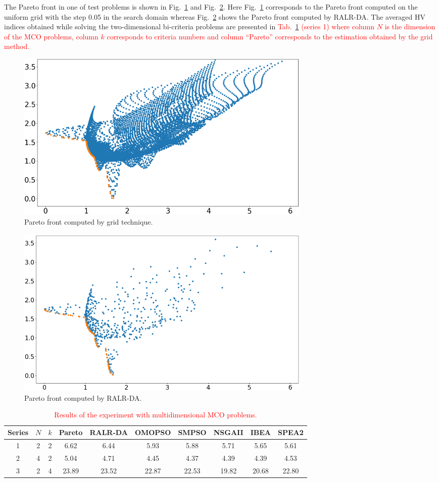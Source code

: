 \documentclass[runningheads]{llncs}
\begin{document}
The Pareto front in one of test problems is shown in Fig.~\ref{fig2a} and Fig.~\ref{fig2b}. Here Fig.~\ref{fig2a} corresponds to the Pareto front computed on the uniform grid with the step 0.05 in the search domain whereas Fig.~\ref{fig2b} shows the Pareto front computed by RALR-DA. The averaged HV indices obtained while solving the two-dimensional bi-criteria problems are presented in \textcolor{red}{ Tab.~\ref{tab4_6} (series 1) where column $N$ is the dimension of the MCO problems, column $k$ corresponds to criteria numbers and column ``Pareto'' corresponds to the estimation obtained by the grid method.}

\begin{figure}
\centering
\includegraphics[width=0.7\textwidth]{fig2a.png} 
\caption{Pareto front computed by grid technique.}\label{fig2a} 
\end{figure}

\begin{figure}
\centering
\includegraphics[width=0.7\textwidth]{fig2b.png} 
\caption{Pareto front computed by RALR-DA.}\label{fig2b} 
\end{figure}

\begin{table}
\caption{\textcolor{red}{ Results of the experiment with multidimensional MCO problems.}}
\centering
\begin{tabular}{cccccccccc} \hline
Series& $N$& $k$& Pareto & RALR-DA & OMOPSO &SMPSO & NSGAII & IBEA & SPEA2  \\ \hline
1& 2&	2 & 6.62 & 6.44 & 5.93 & 5.88 & 5.71 & 5.65 & 5.61 \\ 
2& 4&	2 & 5.04 & 4.71 & 4.45 & 4.37 & 4.39 & 4.39 & 4.53 \\ 
3& 2&	4 &  23.89 & 23.52 & 22.87 & 22.53 & 19.82 & 20.68 & 22.80 \\ \hline
\end{tabular}
\label{tab4_6}
\end{table}
\end{document}
